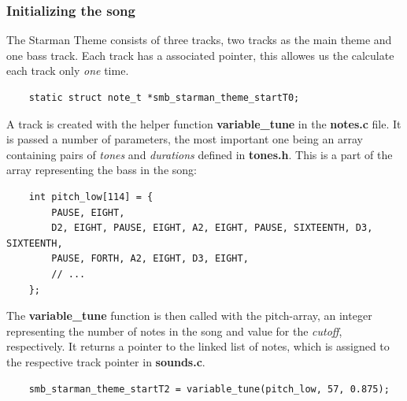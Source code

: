 \subsubsection{Initializing the song}
The Starman Theme consists of three tracks, two tracks as the main theme and one bass track.
Each track has a associated pointer, this allowes us the calculate each track only
\textit{one} time.
\begin{lstlisting}
	static struct note_t *smb_starman_theme_startT0;
\end{lstlisting}
A track is created with the helper function \textbf{variable\_tune} in the \textbf{notes.c} file.
It is passed a number of parameters, the most important one being an array containing pairs
of \textit{tones} and \textit{durations} defined in \textbf{tones.h}. This is a part of the array
representing the bass in the song:
\begin{lstlisting}
	int pitch_low[114] = {
		PAUSE, EIGHT,
		D2, EIGHT, PAUSE, EIGHT, A2, EIGHT, PAUSE, SIXTEENTH, D3, SIXTEENTH,
		PAUSE, FORTH, A2, EIGHT, D3, EIGHT,
		// ...
	};
\end{lstlisting}
The \textbf{variable\_tune} function is then called with the pitch-array, an integer representing
the number of notes in the song and value for the \textit{cutoff}, respectively. It returns a pointer to the linked list of notes, which is assigned to the respective track pointer in
\textbf{sounds.c}.
\begin{lstlisting}
	smb_starman_theme_startT2 = variable_tune(pitch_low, 57, 0.875);
\end{lstlisting}
